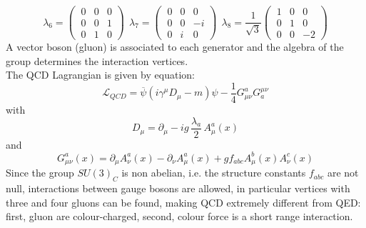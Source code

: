 \begin{equation*}
\lambda_{6} = 
  \begin{pmatrix}
     \ 0 & 0 & 0 \\
     \ 0 & 0 & 1 \\
     \ 0 & 1 & 0
   \end{pmatrix}
\ \ \lambda_{7} = 
  \begin{pmatrix}
     \ 0 & 0 & 0 \\
     \ 0 & 0 & -i \\
     \ 0 & i & 0
   \end{pmatrix}
\ \ \lambda_{8} = \frac{1}{\sqrt{3}} 
  \begin{pmatrix}
     \ 1 & 0 & 0 \\
     \ 0 & 1 & 0 \\
     \ 0 & 0 & -2
   \end{pmatrix}
\end{equation*}
%
A vector boson (gluon) is associated to each generator and the algebra of the group determines the interaction vertices.\\
The QCD Lagrangian is given by equation:
%
\begin{equation}
 \label{lQCD}
 \mathcal{L}_{QCD} = \overbar{\psi}(i\gamma^{\mu}D_{\mu}-m)\psi - \frac{1}{4} G^{a}_{\mu\nu}G_{a}^{\mu\nu}
\end{equation}
%
with
%
\begin{equation*}
  D_{\mu} = \partial_{\mu} - i g \, \frac{\lambda_{a}}{2} \, A^{a}_{\mu}(x)
\end{equation*}
%
and
%
\begin{equation*}
  G^{a}_{\mu\nu}(x)=\partial_{\mu}A^{a}_{\nu}(x)-\partial_{\nu}A^{a}_{\mu}(x)+ g f_{abc} A^{b}_{\mu}(x)A^{c}_{\nu}(x)
\end{equation*}
%
Since the group $SU(3)_{C}$ is non abelian, i.e. the structure constants $f_{abc}$ are not null, interactions between gauge bosons are allowed, in particular vertices with three and four gluons can be found, making QCD extremely different from QED: first, gluon are colour-charged, second, colour force is a short range interaction.
%
